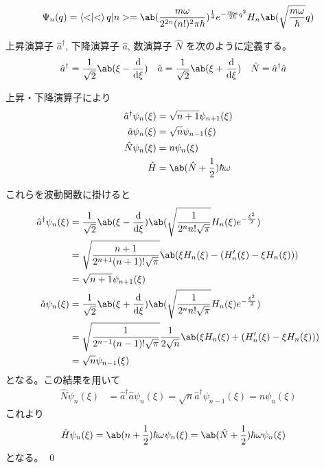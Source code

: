 \documentclass[uplatex,dvipdfmx,a4paper,11pt]{jlreq}
\makeatletter
\numberwithin{equation}{section}
\theoremstyle{definition}
\renewenvironment{proof}[1][\proofname]{\par
  \normalfont
  \topsep6\p@\@plus6\p@ \trivlist
  \item[\hskip\labelsep{\bfseries #1}\@addpunct{\bfseries}]\ignorespaces\quad\par
}{%
  \qed\endtrivlist\@endpefalse
}
\renewcommand\proofname{証明}
\makeatother
\begin{document}
\begin{align}
  \Psi_n(q) = \braket<q|n> = \ab(\frac{m\omega}{2^{2n}(n!)^2\pi\hbar})^{\frac{1}{4}}e^{-\frac{m\omega}{2\hbar}q^2}H_n\ab(\sqrt{\frac{m\omega}{\hbar}}q)
\end{align}

\begin{definition}
  上昇演算子 $\hat{a}^\dagger$, 下降演算子 $\hat{a}$, 数演算子 $\hat{N}$ を次のように定義する。
  \begin{align}
    \hat{a}^\dagger & = \frac{1}{\sqrt{2}}\ab(\xi - \dv{\xi}) & \hat{a} & = \frac{1}{\sqrt{2}}\ab(\xi + \dv{\xi}) & \hat{N} & = \hat{a}^\dagger\hat{a}
  \end{align}
\end{definition}
\begin{proposition}
  上昇・下降演算子により
  \begin{align}
    \hat{a}^\dagger\psi_n(\xi) & = \sqrt{n+1}\psi_{n+1}(\xi)             \\
    \hat{a}\psi_n(\xi)         & = \sqrt{n}\psi_{n-1}(\xi)               \\
    \hat{N}\psi_n(\xi)         & = n\psi_n(\xi)                          \\
    \hat{H}                    & = \ab(\hat{N} + \frac{1}{2})\hbar\omega
  \end{align}
\end{proposition}
\begin{proof}
  これらを波動関数に掛けると
  \begin{align}
    \hat{a}^\dagger\psi_n(\xi) & = \frac{1}{\sqrt{2}}\ab(\xi - \dv{\xi})\ab(\sqrt{\frac{1}{2^nn!\sqrt{\pi}}}H_n(\xi)e^{-\frac{\xi^2}{2}})    \\
                               & = \sqrt{\frac{n+1}{2^{n+1}(n+1)!\sqrt{\pi}}}\ab(\xi H_n(\xi) - (H_n'(\xi) - \xi H_n(\xi)))                  \\
                               & = \sqrt{n+1}\psi_{n+1}(\xi)                                                                                 \\
    \hat{a}\psi_n(\xi)         & = \frac{1}{\sqrt{2}}\ab(\xi + \dv{\xi})\ab(\sqrt{\frac{1}{2^nn!\sqrt{\pi}}}H_n(\xi)e^{-\frac{\xi^2}{2}})    \\
                               & = \sqrt{\frac{1}{2^{n-1}(n-1)!\sqrt{\pi}}}\frac{1}{2\sqrt{n}}\ab(\xi H_n(\xi) + (H_n'(\xi) - \xi H_n(\xi))) \\
                               & = \sqrt{n}\psi_{n-1}(\xi)
  \end{align}
  となる。この結果を用いて
  \begin{align}
    \hat{N}\psi_n(\xi) & = \hat{a}^\dagger\hat{a}\psi_n(\xi) = \sqrt{n}\hat{a}^\dagger\psi_{n-1}(\xi) = n\psi_n(\xi)
  \end{align}
  これより
  \begin{align}
    \hat{H}\psi_n(\xi) & = \ab(n + \frac{1}{2})\hbar\omega\psi_n(\xi) = \ab(\hat{N} + \frac{1}{2})\hbar\omega\psi_n(\xi)
  \end{align}
  となる。
\end{proof}
\end{document}

